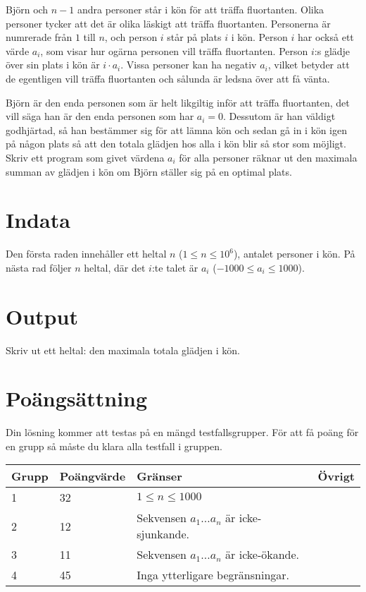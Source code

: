 Björn och $n-1$ andra personer står i kön för att träffa fluortanten. Olika personer tycker att det är olika läskigt att träffa fluortanten. Personerna är numrerade från $1$ till $n$, och person $i$ står på plats $i$ i kön. Person $i$ har också ett värde $a_i$, som visar hur ogärna personen vill träffa fluortanten. Person $i$:s glädje över sin plats i kön är $i \cdot a_i$. Vissa personer kan ha negativ $a_i$,
vilket betyder att de egentligen vill träffa fluortanten och sålunda är ledsna över att få vänta.

Björn är den enda personen som är helt likgiltig inför att träffa fluortanten, det vill säga han är den enda personen som har $a_i = 0$. Dessutom är han väldigt godhjärtad, så han bestämmer sig för att lämna kön och sedan gå in i kön igen på någon plats så att den totala glädjen hos alla i kön blir så stor som möjligt. Skriv ett program som givet värdena $a_i$ för alla personer räknar ut den maximala summan av glädjen i kön om Björn ställer sig på en optimal plats.

\section*{Indata}
Den första raden innehåller ett heltal $n$ ($1 \le n \le 10^6$), antalet personer i kön. På nästa rad följer $n$ heltal, där det $i$:te talet är $a_i$ ($-1000 \le a_i \le 1000$).

\section*{Output}
Skriv ut ett heltal: den maximala totala glädjen i kön.

\section*{Poängsättning}
Din lösning kommer att testas på en mängd testfallsgrupper. För att få poäng för en grupp så måste du klara alla testfall i gruppen.

\noindent
\begin{tabular}{|l|l|l|l|}
\hline
Grupp & Poängvärde & Gränser & Övrigt \\ \hline
1     & 32         & $1 \leq n \leq 1000$ & \\ \hline
2     & 12         & Sekvensen $a_1 \dots a_n$ är icke-sjunkande. \\ \hline
3     & 11         & Sekvensen $a_1 \dots a_n$ är icke-ökande. \\ \hline
4     & 45         & Inga ytterligare begränsningar. & \\ \hline
\end{tabular}

